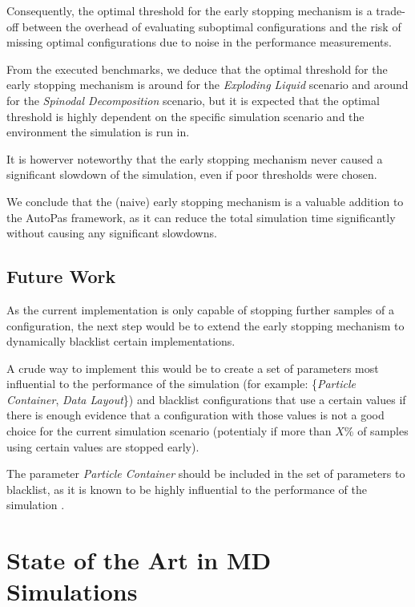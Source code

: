\documentclass[conference]{IEEEtran}
\begin{document}
Consequently, the optimal threshold for the early stopping mechanism is a trade-off between the overhead of evaluating suboptimal configurations and the risk of missing optimal configurations due to noise in the performance measurements.

From the executed benchmarks, we deduce that the optimal threshold for the early stopping mechanism is around  for the \textit{Exploding Liquid} scenario and around  for the \textit{Spinodal Decomposition} scenario, but it is expected that the optimal threshold is highly dependent on the specific simulation scenario and the environment the simulation is run in.

It is howerver noteworthy that the early stopping mechanism never caused a significant slowdown of the simulation, even if poor thresholds were chosen.

We conclude that the (naive) early stopping mechanism is a valuable addition to the AutoPas framework, as it can reduce the total simulation time significantly without causing any significant slowdowns.

\subsection{Future Work}

As the current implementation is only capable of stopping further samples of a configuration, the next step would be to extend the early stopping mechanism to dynamically blacklist certain implementations.

A crude way to implement this would be to create a set of parameters most influential to the performance of the simulation (for example: \{\textit{Particle Container}, \textit{Data Layout}\}) and blacklist configurations that use a certain values if there is enough evidence that a configuration with those values is not a good choice for the current simulation scenario (potentialy if more than $X$\% of samples using certain values are stopped early).

The parameter \textit{Particle Container} should be included in the set of parameters to blacklist, as it is known to be highly influential to the performance of the simulation \cite{Gratl2019AutoPas}.


\newpage
\newpage


\section{State of the Art in MD Simulations}
\end{document}
